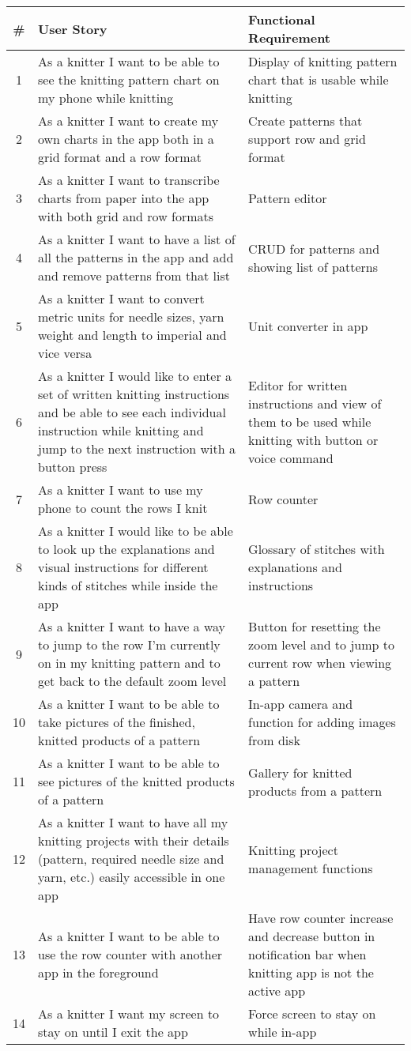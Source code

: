 \label{tabl:requirements}
\begin{longtable}{| c | p{6.5cm} | p{6.5cm} |}
    \hline
   	\# & User Story & Functional Requirement \\ \hline
   	\endhead
    1 &	As a knitter I want to be able to see the knitting pattern chart on my phone while knitting &
	 Display of knitting pattern chart that is usable while knitting \\ \hline
	2 & As a knitter I want to create my own charts in the app both in a grid format and a row format & Create patterns that support row and grid format \\ \hline
	3 & As a knitter I want to transcribe charts from paper into the app with both grid and row formats & Pattern editor \\ \hline
	4 & As a knitter I want to have a list of all the patterns in the app and add and remove patterns from that list & CRUD for patterns and showing list of patterns \\ \hline
	5 & As a knitter I want to convert metric units for needle sizes, yarn weight and length to imperial and vice versa & Unit converter in app  \\ \hline
	6 & As a knitter I would like to enter a set of written knitting instructions and be able to see each individual instruction while knitting and jump to the next instruction with a button press & Editor for written instructions and view of them to be used while knitting with button or voice command \\ \hline
	7 & As a knitter I want to use my phone to count the rows I knit & Row counter \\ \hline
	8 & As a knitter I would like to be able to look up the explanations and visual instructions for different kinds of stitches while inside the app & Glossary of stitches with explanations and instructions \\ \hline
	9 & As a knitter I want to have a way to jump to the row I'm currently on in my knitting pattern and to get back to the default zoom level & Button for resetting the zoom level and to jump to current row when viewing a pattern \\ \hline
	10 & As a knitter I want to be able to take pictures of the finished, knitted products of a pattern & In-app camera and function for adding images from disk \\ \hline
	11 & As a knitter I want to be able to see pictures of the knitted products of a pattern & Gallery for knitted products from a pattern \\ \hline
	12 & As a knitter I want to have all my knitting projects with their details (pattern, required needle size and yarn, etc.) easily accessible in one app & Knitting project management functions  \\ \hline
	13 & As a knitter I want to be able to use the row counter with another app in the foreground &  Have row counter increase and decrease button in notification bar when knitting app is not the active app \\ \hline
	14 & As a knitter I want my screen to stay on until I exit the app & Force screen to stay on while in-app \\ \hline
\end{longtable}

